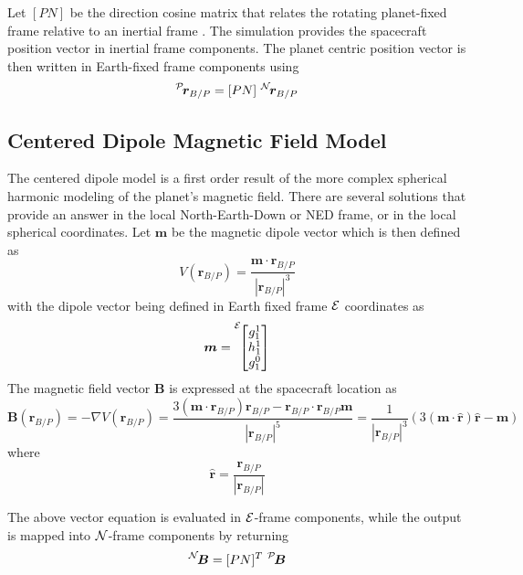 Let $[PN]$ be the direction cosine matrix\cite{schaub} that relates the rotating planet-fixed frame relative to an inertial frame .  The simulation provides the spacecraft position vector in inertial frame components.  The planet centric position vector is then written in Earth-fixed frame components using
\begin{equation}
	\leftexp{P}{\bm r}_{B/P} = [PN] \ \leftexp{N}{\bm r}_{B/P}
\end{equation}




\subsection{Centered Dipole Magnetic Field Model}
The centered dipole model is a first order result of the more complex spherical harmonic modeling of the planet's magnetic field.\cite{Markley:2014lj}  There are several solutions that provide an answer in the local North-Earth-Down or NED frame,\cite{Grifin:2005hx} or in the local  spherical coordinates.  Let  $\bm m$ be the magnetic dipole vector which is then defined as\cite{Markley:2014lj}
\begin{equation}
	V(\bm r_{B/P}) = \frac{\bm m \cdot \bm r_{B/P}}{|\bm r_{B/P}|^{3}}
\end{equation}
with the dipole vector being defined in Earth fixed frame $\cal E$ coordinates as 
\begin{equation}
	\bm m = \leftexp{E}{\begin{bmatrix}
		g_{1}^{1} \\ h_{1}^{1} \\ g_{1}^{0}
	\end{bmatrix}}
\end{equation}
The magnetic field vector $\bm B$ is  expressed at the spacecraft location as
\begin{equation}
	\bm B(\bm r_{B/P}) = - \nabla V(\bm r_{B/P}) = \frac{3 (\bm m \cdot \bm r_{B/P}) \bm r_{B/P} - \bm r_{B/P} \cdot \bm r_{B/P} \bm m}{|\bm r_{B/P}|^{5}}
	= \frac{1}{|\bm r_{B/P}|^{3}} \left ( 3 (\bm m \cdot \hat{\bm r}) \hat{\bm r} - \bm m \right)
\end{equation}
where 
\begin{equation}
	\hat{\bm r} = \frac{\bm r_{B/P}}{|\bm r_{B/P}|}
\end{equation}

The above vector equation is evaluated in $\cal E$-frame components, while the output is mapped into $\cal N$-frame components by returning
\begin{equation}
	\leftexp{N}{\bm B} = [PN]^{T} \ \leftexp{P}{\bm B}
\end{equation}
